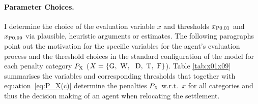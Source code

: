 
\paragraph{Parameter Choices.} %
I determine the choice of the evaluation variable $x$ and thresholds $x_{\rm P0.01}$ and $x_{\rm P0.99}$ via plausible, heuristic arguments or estimates.
The following paragraphs point out the motivation for the specific variables for the agent's evaluation process and the threshold choices in the standard configuration of the model for each penalty category $P_{\rm X}$ ($X=\{\text{G,\, W, \, D,\, T,\, F}\}$).
Table \ref{tab:x01x09} summarises the variables and corresponding thresholds that together with equation~\ref{eq:P_X(c)} determine the penalties $P_{\rm X}$ w.r.t.\ $x$ for all categories and thus the decision making of an agent when relocating the settlement.


